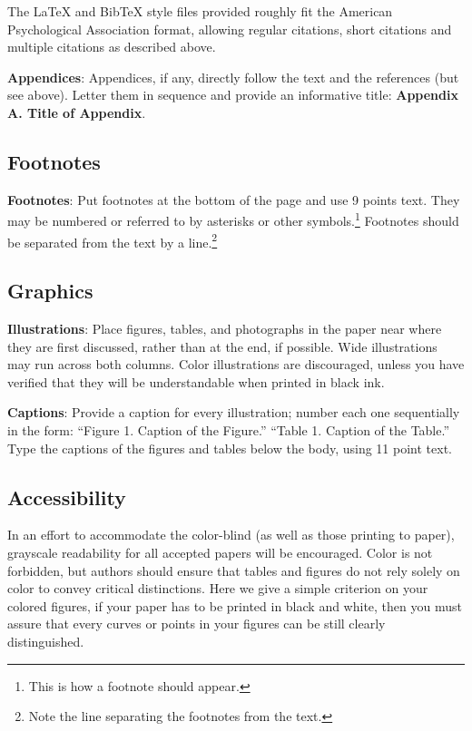 \documentclass[11pt,a4paper]{article}
\begin{document}
The \LaTeX{} and Bib\TeX{} style files provided roughly fit the
American Psychological Association format, allowing regular citations, 
short citations and multiple citations as described above.

{\bf Appendices}: Appendices, if any, directly follow the text and the
references (but see above).  Letter them in sequence and provide an
informative title: {\bf Appendix A. Title of Appendix}.

\subsection{Footnotes}

{\bf Footnotes}: Put footnotes at the bottom of the page and use 9
points text. They may be numbered or referred to by asterisks or other
symbols.\footnote{This is how a footnote should appear.} Footnotes
should be separated from the text by a line.\footnote{Note the line
separating the footnotes from the text.}

\subsection{Graphics}

{\bf Illustrations}: Place figures, tables, and photographs in the
paper near where they are first discussed, rather than at the end, if
possible.  Wide illustrations may run across both columns.  Color
illustrations are discouraged, unless you have verified that  
they will be understandable when printed in black ink.

{\bf Captions}: Provide a caption for every illustration; number each one
sequentially in the form:  ``Figure 1. Caption of the Figure.'' ``Table 1.
Caption of the Table.''  Type the captions of the figures and 
tables below the body, using 11 point text.

\subsection{Accessibility}
\label{ssec:accessibility}

In an effort to accommodate the color-blind (as well as those printing
to paper), grayscale readability for all accepted papers will be
encouraged.  Color is not forbidden, but authors should ensure that
tables and figures do not rely solely on color to convey critical
distinctions.
Here we give a simple criterion on your colored figures, if your paper has to be printed in black and white, then you must assure that every curves or points in your figures can be still clearly distinguished.
\end{document}
